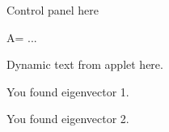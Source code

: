 \documentclass{ximera}
\begin{document}
\begin{problem}

\begin{validator}
Control panel here

A= ...


Dynamic text from applet here.
\end{validator}

\begin{feedback}
  You found eigenvector 1.
\end{feedback}

\begin{feedback}
  You found eigenvector 2.
\end{feedback}

\end{problem}
\end{document}
